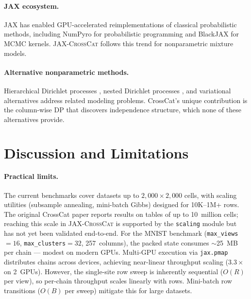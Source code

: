 \documentclass[11pt]{article}
\newcommand{\jaxcc}{\textsc{JAX-CrossCat}}
\begin{document}
\paragraph{JAX ecosystem.} JAX \citep{jax2018github} has enabled
GPU-accelerated reimplementations of classical probabilistic methods,
including NumPyro \citep{phan2019composable} for probabilistic
programming and BlackJAX \citep{cabezas2024blackjax} for MCMC kernels.
\jaxcc{} follows this trend for nonparametric mixture models.

\paragraph{Alternative nonparametric methods.} Hierarchical Dirichlet
processes \citep{teh2006hierarchical}, nested Dirichlet processes
\citep{rodriguez2008nested}, and variational alternatives
\citep{guan2010variational} address related modeling problems. CrossCat's
unique contribution is the column-wise DP that discovers independence
structure, which none of these alternatives provide.

\section{Discussion and Limitations}
\label{sec:discussion}

\paragraph{Practical limits.} The current benchmarks cover datasets up
to $2{,}000 \times 2{,}000$ cells, with scaling utilities (subsample
annealing, mini-batch Gibbs) designed for 10K--1M+ rows. The original
CrossCat paper reports results on tables of up to 10~million cells;
reaching this scale in \jaxcc{} is supported by the \texttt{scaling}
module but has not yet been validated end-to-end. For the MNIST
benchmark (\texttt{max\_views}${}=16$, \texttt{max\_clusters}${}=32$,
257~columns), the packed state consumes ${\sim}$25~MB per chain ---
modest on modern GPUs. Multi-GPU execution via \texttt{jax.pmap}
distributes chains across devices, achieving near-linear throughput
scaling ($3.3\times$ on 2~GPUs). However, the single-site row sweep
is inherently sequential ($O(R)$ per view), so per-chain throughput
scales linearly with rows. Mini-batch row transitions ($O(B)$ per
sweep) mitigate this for large datasets.
\end{document}
